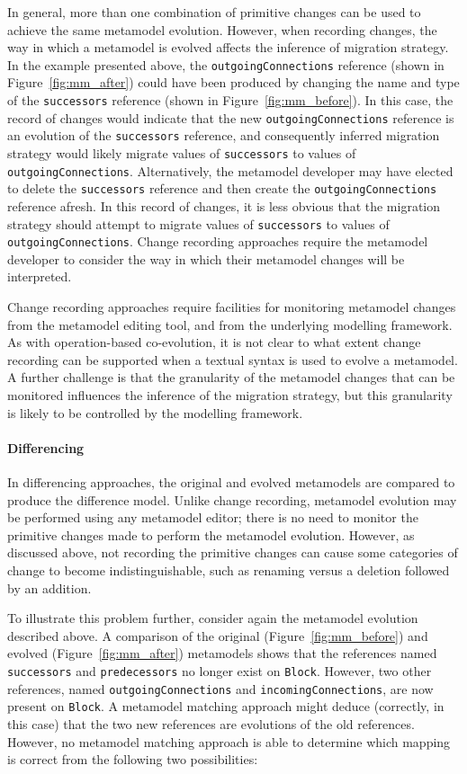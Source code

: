 In general, more than one combination of primitive changes can be used to achieve the same metamodel evolution. However, when recording changes, the way in which a metamodel is evolved affects the inference of migration strategy. In the example presented above, the \texttt{outgoingConnections} reference (shown in Figure~\ref{fig:mm_after}) could have been produced by changing the name and type of the \texttt{successors} reference (shown in Figure~\ref{fig:mm_before}). In this case, the record of changes would indicate that the new \texttt{outgoingConnections} reference is an evolution of the \texttt{successors} reference, and consequently inferred migration strategy would likely migrate values of \texttt{successors} to values of \texttt{out\-go\-ingCon\-nect\-ions}. Alternatively, the metamodel developer may have elected to delete the \texttt{successors} reference and then create the \texttt{out\-go\-ingCon\-nect\-ions} reference afresh. In this record of changes, it is less obvious that the migration strategy should attempt to migrate values of \texttt{successors} to values of \texttt{out\-go\-ingCon\-nect\-ions}. Change recording approaches require the metamodel developer to consider the way in which their metamodel changes will be interpreted.

Change recording approaches require facilities for monitoring metamodel changes from the metamodel editing tool, and from the underlying modelling framework. As with operation-based co-evolution, it is not clear to what extent change recording can be supported when a textual syntax is used to evolve a metamodel. A further challenge is that the granularity of the metamodel changes that can be monitored influences the inference of the migration strategy, but this granularity is likely to be controlled by the modelling framework.


\paragraph{Differencing}
In differencing approaches, the original and evolved metamodels are compared to produce the difference model. Unlike change recording, metamodel evolution may be performed using any metamodel editor; there is no need to monitor the primitive changes made to perform the metamodel evolution. However, as discussed above, not recording the primitive changes can cause some categories of change to become indistinguishable, such as renaming versus a deletion followed by an addition.

To illustrate this problem further, consider again the metamodel evolution described above. A comparison of the original (Figure~\ref{fig:mm_before}) and evolved (Figure~\ref{fig:mm_after}) metamodels shows that the references named \texttt{successors} and \texttt{predecessors} no longer exist on \texttt{Block}. However, two other references, named \texttt{out\-go\-ingCon\-nect\-ions} and \texttt{incomingConnections}, are now present on \texttt{Block}. A metamodel matching approach might deduce (correctly, in this case) that the two new references are evolutions of the old references. However, no metamodel matching approach is able to determine which mapping is correct from the following two possibilities:

